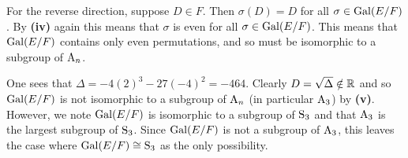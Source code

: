\begin{questions}
\begin{partquestions}{\roman*}
        For the reverse direction, suppose $D \in F$. Then $\sigma(D) = D$ for all $\sigma \in \mathrm{Gal}(E/F)$. By \textbf{(iv)} again this means that $\sigma$ is even for all $\sigma \in \mathrm{Gal}(E/F)$. This means that $\mathrm{Gal}(E/F)$ contains only even permutations, and so must be isomorphic to a subgroup of $\mathrm{A}_{n}$.

        \item One sees that $\Delta = -4(2)^3 - 27(-4)^2 = -464$. Clearly $D = \sqrt{\Delta} \notin \mathbb{R}$ and so $\mathrm{Gal}(E/F)$ is not isomorphic to a subgroup of $\mathrm{A}_{n}$ (in particular $\mathrm{A}_{3}$) by \textbf{(v)}. However, we note $\mathrm{Gal}(E/F)$ is isomorphic to a subgroup of $\mathrm{S}_{3}$ and that $\mathrm{A}_{3}$ is the largest subgroup of $\mathrm{S}_{3}$. Since $\mathrm{Gal}(E/F)$ is not a subgroup of $\mathrm{A}_{3}$, this leaves the case where $\mathrm{Gal}(E/F) \cong \mathrm{S}_{3}$ as the only possibility.
    \end{partquestions}
\end{questions}
